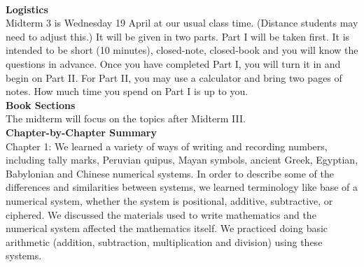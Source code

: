 \documentclass[11pt,fleqn]{article}
\begin{document}
\renewcommand{\headrulewidth}{0pt}
\newcommand{\blank}[1]{\rule{#1}{0.75pt}}
\newcommand{\bc}{\begin{center}}
\newcommand{\ec}{\end{center}}
\renewcommand{\d}{\displaystyle}

\vspace*{-0.7in}

\begin{center}
  \large
  \\
\end{center}
\noindent\textbf{Logistics}\\

Midterm 3 is Wednesday 19 April at our usual class time. (Distance students may need to adjust this.) It will be given in two parts. Part I will be taken first. It is intended to be short (10 minutes), closed-note, closed-book and you will know the questions in advance. Once you have completed Part I, you will turn it in and begin on Part II.  For Part II, you may use a calculator and bring two pages of notes. How much time you spend on Part I is up to you.  \\

\noindent\textbf{Book Sections}\\

The midterm will focus on the topics after Midterm III.\\

\noindent\textbf{Chapter-by-Chapter Summary}\\

Chapter 1: We learned a variety of ways of writing and recording numbers, including tally marks,  Peruvian quipus, Mayan symbols, ancient Greek, Egyptian, Babylonian and Chinese numerical systems. In order to describe some of the differences and similarities between systems, we learned terminology like base of a numerical system, whether the system is positional, additive, subtractive,  or ciphered. We discussed the materials used to write mathematics and the numerical system affected the mathematics itself. We practiced doing basic arithmetic (addition, subtraction, multiplication and division) using these systems.\\
\end{document}
